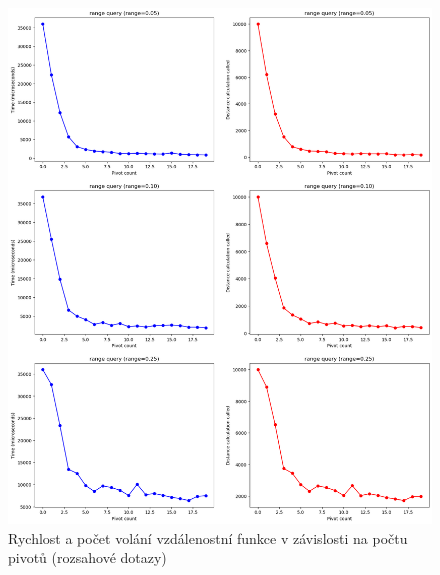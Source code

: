 \documentclass{article}
\begin{document}
\begin{figure}[H]
    \centering
    \includegraphics[width=\textwidth]{img/pivot_count_range.png}
    \caption{Rychlost a počet volání vzdálenostní funkce v závislosti na počtu pivotů (rozsahové dotazy)}
\end{figure}
\end{document}
